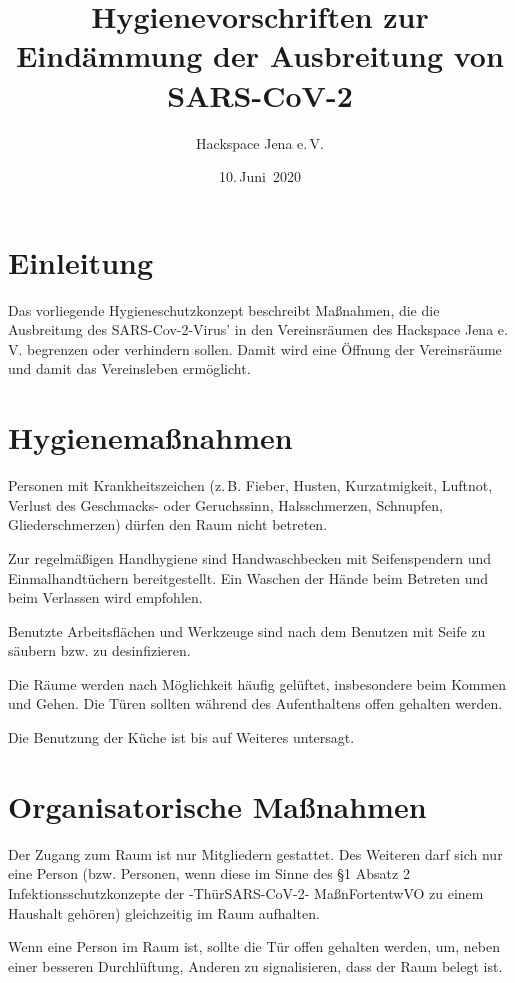 \documentclass[a4paper,12pt,parskip=half]{scrartcl}
\title{Hygienevorschriften zur Eindämmung der Ausbreitung von SARS-CoV-2}
\author{Hackspace Jena e.\,V.}
\date{10.\,Juni~2020}
\begin{document}
\maketitle

\section*{Einleitung}

Das vorliegende Hygieneschutzkonzept beschreibt Maßnahmen, die die Ausbreitung des SARS-Cov-2-Virus' in den Vereinsräumen des Hackspace Jena e.\,V. begrenzen oder verhindern sollen. Damit wird eine Öffnung der Vereinsräume und damit das Vereinsleben ermöglicht.

\section*{Hygienemaßnahmen}

Personen mit Krankheitszeichen (z.\,B. Fieber, Husten, Kurzatmigkeit, Luftnot, Verlust des
Geschmacks- oder Geruchssinn, Halsschmerzen, Schnupfen, Gliederschmerzen) dürfen den Raum nicht betreten.

Zur regelmäßigen Handhygiene sind Handwaschbecken mit Seifenspendern und
Einmalhandtüchern bereitgestellt. Ein Waschen der Hände beim Betreten und beim Verlassen wird empfohlen.

Benutzte Arbeitsflächen und Werkzeuge sind nach dem Benutzen mit Seife zu säubern bzw. zu desinfizieren.

Die Räume werden nach Möglichkeit häufig gelüftet, insbesondere beim Kommen und Gehen. Die Türen sollten während des Aufenthaltens offen gehalten werden.

Die Benutzung der Küche ist bis auf Weiteres untersagt.

\section*{Organisatorische Maßnahmen}

Der Zugang zum Raum ist nur Mitgliedern gestattet. Des Weiteren darf sich nur eine Person (bzw. Personen, wenn diese im Sinne des §1 Absatz 2 Infektionsschutzkonzepte der -ThürSARS-CoV-2-
MaßnFortentwVO zu einem Haushalt gehören) gleichzeitig im Raum aufhalten.

Wenn eine Person im Raum ist, sollte die Tür offen gehalten werden, um, neben einer besseren Durchlüftung, Anderen zu signalisieren, dass der Raum belegt ist. 
\end{document}

